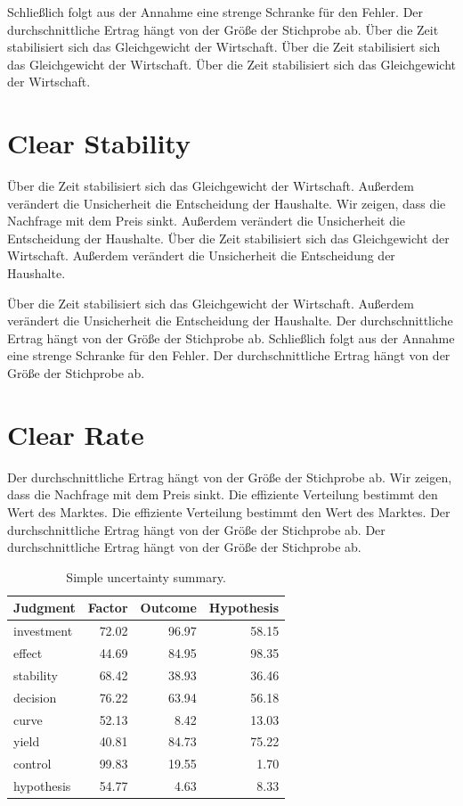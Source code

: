 \documentclass[11pt]{article}
\begin{document}
Schließlich folgt aus der Annahme eine strenge Schranke für den Fehler. Der durchschnittliche Ertrag hängt von der Größe der Stichprobe ab. Über die Zeit stabilisiert sich das Gleichgewicht der Wirtschaft. Über die Zeit stabilisiert sich das Gleichgewicht der Wirtschaft. Über die Zeit stabilisiert sich das Gleichgewicht der Wirtschaft.

\section{Clear Stability}\label{sec:5}

Über die Zeit stabilisiert sich das Gleichgewicht der Wirtschaft. Außerdem verändert die Unsicherheit die Entscheidung der Haushalte. Wir zeigen, dass die Nachfrage mit dem Preis sinkt. Außerdem verändert die Unsicherheit die Entscheidung der Haushalte. Über die Zeit stabilisiert sich das Gleichgewicht der Wirtschaft. Außerdem verändert die Unsicherheit die Entscheidung der Haushalte.

Über die Zeit stabilisiert sich das Gleichgewicht der Wirtschaft. Außerdem verändert die Unsicherheit die Entscheidung der Haushalte. Der durchschnittliche Ertrag hängt von der Größe der Stichprobe ab. Schließlich folgt aus der Annahme eine strenge Schranke für den Fehler. Der durchschnittliche Ertrag hängt von der Größe der Stichprobe ab.

\section{Clear Rate}\label{sec:6}

Der durchschnittliche Ertrag hängt von der Größe der Stichprobe ab. Wir zeigen, dass die Nachfrage mit dem Preis sinkt. Die effiziente Verteilung bestimmt den Wert des Marktes. Die effiziente Verteilung bestimmt den Wert des Marktes. Der durchschnittliche Ertrag hängt von der Größe der Stichprobe ab. Der durchschnittliche Ertrag hängt von der Größe der Stichprobe ab.

\begin{table}[tbp]\centering\caption{Simple uncertainty summary.}\label{tab:b6}\begin{tabular}{lrrr}\toprule Judgment & Factor & Outcome & Hypothesis \\ \midrule
investment & 72.02 & 96.97 & 58.15 \\
effect & 44.69 & 84.95 & 98.35 \\
stability & 68.42 & 38.93 & 36.46 \\
decision & 76.22 & 63.94 & 56.18 \\
curve & 52.13 & 8.42 & 13.03 \\
yield & 40.81 & 84.73 & 75.22 \\
control & 99.83 & 19.55 & 1.70 \\
hypothesis & 54.77 & 4.63 & 8.33 \\
\bottomrule\end{tabular}\end{table}
\end{document}
